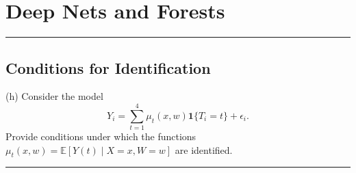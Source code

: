 \documentclass{article}
\newenvironment{colorparagraph}[1]{\par\color{#1}}{\par}
\begin{document}

\begin{colorparagraph}{questioncolor}
\section*{Deep Nets and Forests}
\label{q3h}
\rule{\textwidth}{0.5pt}
\subsection{Conditions for Identification}
(h) Consider the model
\[
Y_i = \sum_{t=1}^4 \mu_t(x, w) \mathbf{1}\{T_i = t\} + \epsilon_i.
\]
Provide conditions under which the functions \( \mu_t(x, w) = \mathbb{E}[Y(t) \mid X = x, W = w] \) are identified.

\rule{\textwidth}{0.5pt}
\end{colorparagraph}
\end{document}
